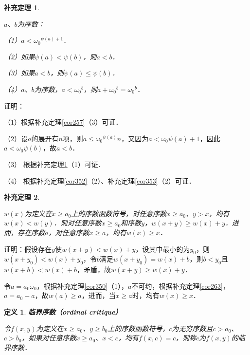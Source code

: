 \documentclass[12pt, a4paper, oneside]{book}
\newtheorem{cor}{补充定理}
\newtheorem{de}{定义}
\begin{document}
			\begin{cor}\label{cor354}
				\hfill\par
				$a$、$b$为序数：
				\par
				（1）$a<{\omega_0}^{\psi(a)+1}$．
				\par
				（2）如果$\psi(a)<\psi(b)$，则$a<b$．
				\par
				（3）如果$a<b$，则$\psi(a)\leq \psi(b)$．
				\par
				（4）$a$、$b$为序数，$a<{\omega_0}^b$，则$a+{\omega_0}^b={\omega_0}^b$．
			\end{cor}
			证明：
			\par
			（1）根据补充定理\ref{cor257}（3）可证．
			\par
			（2）设$a$的展开有$n$项，则$a\leq {\omega_0}^{\psi(a)}n$，又因为$a<\omega_0\psi(a)+1$，因此$a<\omega_0\psi(b)$，故$a<b$．
			\par
			（3）	根据补充定理\ref{cor354}（1）可证．
			\par
			（4）	根据补充定理\ref{cor352}（2）、补充定理\ref{cor353}（2）可证．
			
			\begin{cor}\label{cor355}
				\hfill\par
				$w(x)$为定义在$x\geq a_0$上的序数函数符号，对任意序数$x\geq a_0$、$y>x$，均有$w(x)<w(y)$．则对任意序数$x\geq a_0$和序数$y$，$w(x+y)\geq w(x)+y$．进而，存在序数$a$，对任意序数$x\geq a$，均有$w(x)\geq x$．
			\end{cor}
			证明：假设存在$y$使$w(x+y)<w(x)+y$，设其中最小的为$y_0$，则$w(x+y_0)<w(x)+y_0$，令$b$满足$w(x+y_0)=w(x)+b$，则$b<y_0$且$w(x+b)<w(x)+b$，矛盾，故$w(x+y)\geq w(x)+y$．
			\par
			令$a=a_0\omega_0$，根据补充定理\ref{cor350}（1），$a$不可约，根据补充定理\ref{cor263}，$a=a_0+a$，故$w(a)\geq a$，进而，当$x\geq a$时，均有$w(x)\geq x$．
			
			\begin{de}
				\textbf{临界序数（ordinal critique）}
				\par
				令$f(x, y)$为定义在$x\geq a_0$、$y\geq b_0$上的序数函数符号，$c$为无穷序数且$c>a_0$、$c>b_0$，如果对任意序数$x\geq a_0$、$x<c$，均有$f(x, c)=c$，则称$c$为$f(x, y)$的临界序数．
			\end{de}
			
\end{document}
